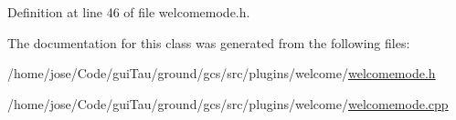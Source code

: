 Definition at line 46 of file welcomemode.\-h.



The documentation for this class was generated from the following files\-:\begin{DoxyCompactItemize}
\item 
/home/jose/\-Code/gui\-Tau/ground/gcs/src/plugins/welcome/\hyperlink{welcomemode_8h}{welcomemode.\-h}\item 
/home/jose/\-Code/gui\-Tau/ground/gcs/src/plugins/welcome/\hyperlink{welcomemode_8cpp}{welcomemode.\-cpp}\end{DoxyCompactItemize}

